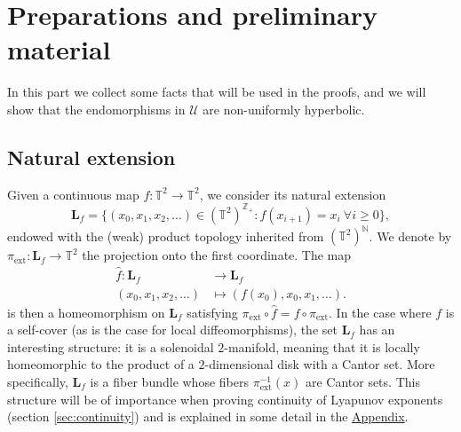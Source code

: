 \documentclass[11pt,letterpaper,reqno]{article}
\newcommand{\Z}{\mathbb{Z}}
\newcommand{\N}{\mathbb{N}}
\newcommand{\TT}{\mathbb{T}^2}
\newcommand{\hTTf}[1][f]{\mathbf{L}_{#1}}
\newcommand{\hf}{\hat{f}}
\newcommand{\pext}{\pi_{\mathrm{ext}}}
\begin{document}


\section{Preparations and preliminary material} %
\label{sec:preparations_and_preliminary_material}

In this part we collect some facts that will be used in the proofs, and we will show that the endomorphisms in $\mathcal U$ are non-uniformly hyperbolic. 

\subsection{Natural extension}\label{sub:naturalext}

Given a continuous map $f: \TT \to \TT$, we consider its natural extension
\[\hTTf = \{ (x_0, x_1, x_2, \ldots) \in (\TT)^{\Z_+}: f(x_{i+1}) = x_{i} \ \forall i \geq 0 \},\]
endowed with the (weak) product topology inherited from $(\TT)^{\N}$. We denote by $\pext: \hTTf \to \TT$ the projection onto the first coordinate.
The map
\begin{align*}
\hf: \hTTf & \to \hTTf \\
 (x_0, x_1, x_2, \ldots) & \mapsto (f(x_0), x_0, x_1, \ldots).
\end{align*}
is then a homeomorphism on $\hTTf$ satisfying $\pext \circ \hf = f \circ \pext$. In the case where $f$ is a self-cover (as is the case for local diffeomorphisms), the set $\hTTf$ has an interesting structure: it is a solenoidal $2$-manifold, meaning that it is locally homeomorphic to the product of a $2$-dimensional disk with a Cantor set. More specifically, $\hTTf$ is a fiber bundle whose fibers $\pext^{-1}(x)$ are Cantor sets. This structure will be of importance when proving continuity of Lyapunov exponents (section \ref{sec:continuity}) and is explained in some detail in the \hyperlink{sec:appendix}{Appendix}. 
\end{document}
